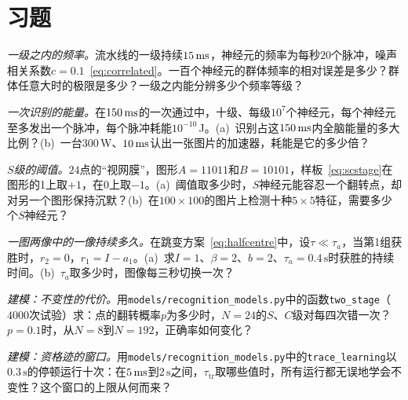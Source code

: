 \section{习题}

\begin{exercise}[\lvlA]
\label{ex:12:1}
\emph{一级之内的频率。}流水线的一级持续$15\,\text{ms}$，神经元的频率为每秒$20$个脉冲，噪声相关系数$c=0.1$~\eqref{eq:correlated}。一百个神经元的群体频率的相对误差是多少？群体任意大时的极限是多少？一级之内能分辨多少个频率等级？
\end{exercise}

\begin{exercise}[\lvlA]
\label{ex:12:2}
\emph{一次识别的能量。}在$150\,\text{ms}$的一次通过中，十级、每级$10^7$个神经元，每个神经元至多发出一个脉冲，每个脉冲耗能$10^{-10}$\,J。(a)~识别占这$150\,\text{ms}$内全脑能量的多大比例？(b)~一台$300$\,W、$10\,\text{ms}$认出一张图片的加速器，耗能是它的多少倍？
\end{exercise}

\begin{exercise}[\lvlB]
\label{ex:12:3}
\emph{$S$级的阈值。}$24$点的“视网膜”，图形$A=11011$和$B=10101$，样板~\eqref{eq:scstage}在图形的1上取$+1$，在0上取$-1$。(a)~阈值取多少时，$S$神经元能容忍一个翻转点，却对另一个图形保持沉默？(b)~在$100\times100$的图片上检测十种$5\times5$特征，需要多少个$S$神经元？
\end{exercise}

\begin{exercise}[\lvlB]
\label{ex:12:4}
\emph{一图两像中的一像持续多久。}在跳变方案~\eqref{eq:halfcentre}中，设$\tau\ll\tau_a$，当第1组获胜时，$r_2=0$，$r_1=I-a_1$。(a)~求$I=1$、$\beta=2$、$b=2$、$\tau_a=0.4\,\text{s}$时获胜的持续时间。(b)~$\tau_a$取多少时，图像每三秒切换一次？
\end{exercise}

\begin{exercise}[\lvlB]
\label{ex:12:5}
\emph{建模：不变性的代价。}用\texttt{models/\allowbreak recognition\_models.py}中的函数\texttt{two\_stage}（$4000$次试验）求：点的翻转概率$p$为多少时，$N=24$的$S$、$C$级对每四次错一次？$p=0.1$时，从$N=8$到$N=192$，正确率如何变化？
\end{exercise}

\begin{exercise}[\lvlB]
\label{ex:12:6}
\emph{建模：资格迹的窗口。}用\texttt{models/\allowbreak recognition\_models.py}中的\texttt{trace\_learning}以$0.3\,\text{s}$的停顿运行十次：在$5\,\text{ms}$到$2\,\text{s}$之间，$\tau_{\text{tr}}$取哪些值时，所有运行都无误地学会不变性？这个窗口的上限从何而来？
\end{exercise}

